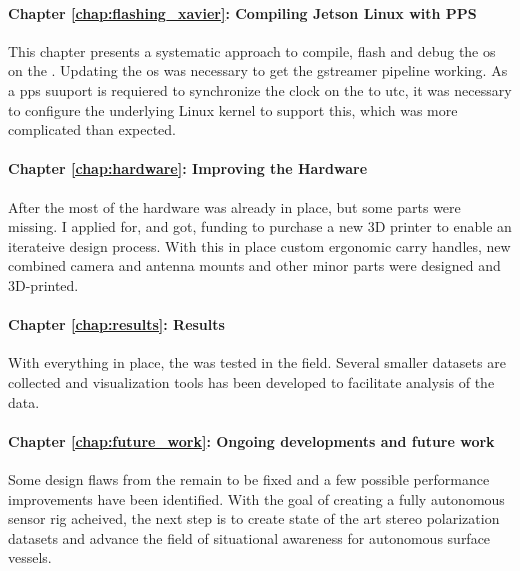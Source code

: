 \paragraph{Chapter \ref{chap:flashing_xavier}: Compiling Jetson Linux with PPS}
This chapter presents a systematic approach to compile, flash and debug the \gls{os} on the \jx.
Updating the \gls{os} was necessary to get the \gls{gstreamer} pipeline working.
As a \gls{pps} suuport is requiered  to synchronize the clock on the \jx to \gls{utc}, it was necessary to configure the underlying Linux kernel to support this, which was more complicated than expected.

\paragraph{Chapter \ref{chap:hardware}: Improving the Hardware}
After the \preproject most of the hardware was already in place, but some parts were missing.
I applied for, and got, funding to purchase a new 3D printer to enable an iterateive design process.
With this in place custom ergonomic carry handles, new combined camera and antenna mounts and other minor parts were designed and 3D-printed.

\paragraph{Chapter \ref{chap:results}: Results}
With everything in place, the \sr was tested in the field.
Several smaller datasets are collected and visualization tools has been developed to facilitate analysis of the data.

\paragraph{Chapter \ref{chap:future_work}: Ongoing developments and future work}
Some design flaws from the \preproject remain to be fixed and a few possible performance improvements have been identified.
With the goal of creating a fully autonomous sensor rig acheived, the next step is to create state of the art stereo polarization datasets and advance the field of situational awareness for autonomous surface vessels.


